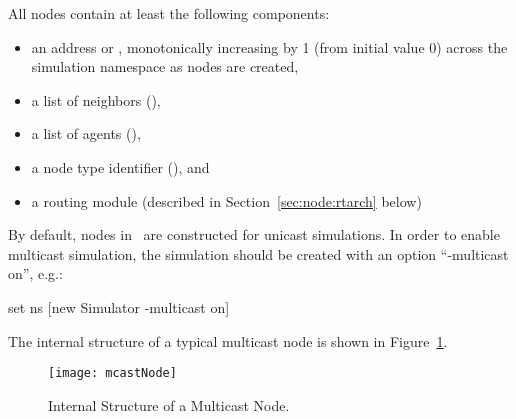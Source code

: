 All nodes contain at least the following components:
\begin{itemize}
\item an address or , monotonically increasing by 1 (from 
initial value 0) across the simulation namespace as nodes are created,
\item a list of neighbors (),
\item a list of agents (),
\item a node type identifier (), and
\item a routing module (described in Section~\ref{sec:node:rtarch} below)
\end{itemize}

% 

By default, nodes in \ns\ are constructed for unicast simulations.
In order to enable multicast simulation, the simulation should be created 
with an option ``-multicast on'', e.g.:
\begin{program}
        set ns [new Simulator -multicast on]
\end{program}
The internal structure of a typical multicast node is shown in
Figure~\ref{fig:node:multicast}.
\begin{figure}
  \centerline{\texttt{[image: mcastNode]}}
  \caption{Internal Structure of a Multicast Node.}
  \label{fig:node:multicast}
\end{figure}

